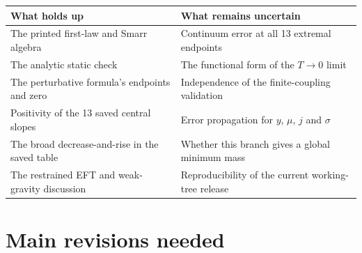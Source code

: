 \documentclass[11pt,a4paper]{article}
\begin{document}
\begin{center}
\renewcommand{\arraystretch}{1.25}
\begin{tabular}{@{}p{}p{}@{}}
\toprule
\textcolor{good}{\textbf{What holds up}} & \textcolor{caution}{\textbf{What remains uncertain}} \\
\midrule
The printed first-law and Smarr algebra & Continuum error at all 13 extremal endpoints \\
The analytic static check & The functional form of the $T\to0$ limit \\
The perturbative formula's endpoints and zero & Independence of the finite-coupling validation \\
Positivity of the 13 saved central slopes & Error propagation for $y$, $\mu$, $j$ and $\sigma$ \\
The broad decrease-and-rise in the saved table & Whether this branch gives a global minimum mass \\
The restrained EFT and weak-gravity discussion & Reproducibility of the current working-tree release \\
\bottomrule
\end{tabular}
\end{center}

\section*{Main revisions needed}
\end{document}
